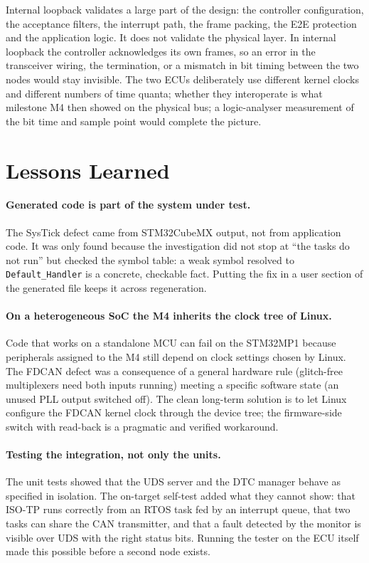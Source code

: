 Internal loopback validates a large part of the design: the controller configuration, the acceptance filters, the interrupt path, the frame packing, the E2E protection and the application logic. It does not validate the physical layer. In internal loopback the controller acknowledges its own frames, so an error in the transceiver wiring, the termination, or a mismatch in bit timing between the two nodes would stay invisible. The two ECUs deliberately use different kernel clocks and different numbers of time quanta; whether they interoperate is what milestone M4 then showed on the physical bus; a logic-analyser measurement of the bit time and sample point would complete the picture.

\section{Lessons Learned}

\paragraph{Generated code is part of the system under test.} The SysTick defect came from STM32CubeMX output, not from application code. It was only found because the investigation did not stop at ``the tasks do not run'' but checked the symbol table: a weak symbol resolved to \texttt{Default\_Handler} is a concrete, checkable fact. Putting the fix in a user section of the generated file keeps it across regeneration.

\paragraph{On a heterogeneous SoC the M4 inherits the clock tree of Linux.} Code that works on a standalone MCU can fail on the STM32MP1 because peripherals assigned to the M4 still depend on clock settings chosen by Linux. The FDCAN defect was a consequence of a general hardware rule (glitch-free multiplexers need both inputs running) meeting a specific software state (an unused PLL output switched off). The clean long-term solution is to let Linux configure the FDCAN kernel clock through the device tree; the firmware-side switch with read-back is a pragmatic and verified workaround.

\paragraph{Testing the integration, not only the units.} The unit tests showed that the UDS server and the DTC manager behave as specified in isolation. The on-target self-test added what they cannot show: that ISO-TP runs correctly from an RTOS task fed by an interrupt queue, that two tasks can share the CAN transmitter, and that a fault detected by the monitor is visible over UDS with the right status bits. Running the tester on the ECU itself made this possible before a second node exists.

